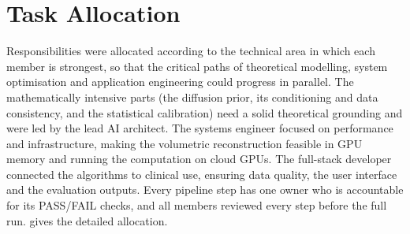 \section{Task Allocation}

Responsibilities were allocated according to the technical area in which each member is strongest, so that the critical paths of theoretical modelling, system optimisation and application engineering could progress in parallel. The mathematically intensive parts (the diffusion prior, its conditioning and data consistency, and the statistical calibration) need a solid theoretical grounding and were led by the lead AI architect. The systems engineer focused on performance and infrastructure, making the volumetric reconstruction feasible in GPU memory and running the computation on cloud GPUs. The full-stack developer connected the algorithms to clinical use, ensuring data quality, the user interface and the evaluation outputs. Every pipeline step has one owner who is accountable for its PASS/FAIL checks, and all members reviewed every step before the full run.  gives the detailed allocation.

